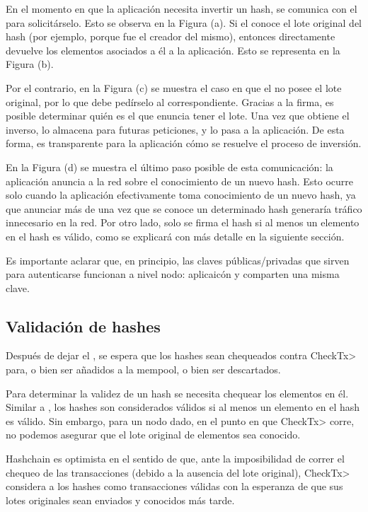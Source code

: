 %
En el momento en que la aplicación necesita invertir un hash, se comunica con el \hcollector
para solicitárselo. Esto se observa en la Figura (a).
%
Si el \hcollector conoce el lote original del hash (por ejemplo, porque fue el \hcollector creador
del mismo), entonces directamente devuelve los elementos asociados a él a la aplicación.
Esto se representa en la Figura (b).
%

Por el contrario, en la Figura (c) se muestra el caso en que el \hcollector no posee el lote original,
por lo que debe pedírselo al \hcollector correspondiente. Gracias a la firma, es posible determinar
quién es el \hcollector que enuncia tener el lote. Una vez que obtiene el inverso, lo almacena para
futuras peticiones, y lo pasa a la aplicación. De esta forma, es transparente para la aplicación
cómo se resuelve el proceso de inversión.

%

En la Figura (d) se muestra el último paso posible de esta comunicación: la aplicación
anuncia a la red sobre el conocimiento de un nuevo hash. Esto ocurre solo cuando la aplicación
efectivamente toma conocimiento de un nuevo hash, ya que anunciar más de una vez que se conoce un
determinado hash generaría tráfico innecesario en la red. Por otro lado, solo se firma el hash si al
menos un elemento en el hash es válido, como se explicará con más detalle en la siguiente sección.

%

Es importante aclarar que, en principio, las claves públicas/privadas que sirven para autenticarse
funcionan a nivel nodo: aplicaicón y \hcollector comparten una misma clave.

\subsection{Validación de hashes}

Después de dejar el \hcollector, se espera que los hashes sean chequeados contra \<CheckTx>
para, o bien ser añadidos a la mempool, o bien ser descartados.

%
Para determinar la validez de un hash se necesita chequear los elementos en él. Similar a
\compresschain, los hashes son considerados válidos si al menos un elemento
en el hash es válido.
%
Sin embargo, para un nodo dado, en el punto en que \<CheckTx> corre, no podemos asegurar que el
lote original de elementos sea conocido.

%
Hashchain es optimista en el sentido de que, ante la imposibilidad de correr el chequeo
de las transacciones (debido a la ausencia del lote original), \<CheckTx> considera a los
hashes como transacciones válidas con la esperanza de que sus lotes originales sean enviados
y conocidos más tarde. 


